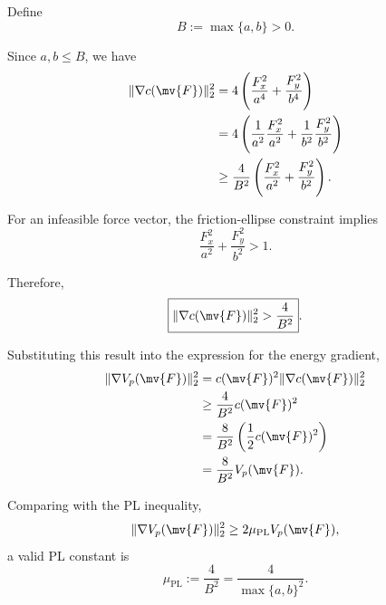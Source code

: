 Define
\begin{equation}
	B
	:=
	\max\{a,b\}
	>0
	.
\end{equation}

Since $a,b\leq B$, we have
\begin{equation}
	\begin{aligned}
		\|\nabla c(\mv{F})\|_2^2
		 & =
		4
		\left(
		\frac{F_x^2}{a^4}
		+
		\frac{F_y^2}{b^4}
		\right)
		\\
		 & =
		4
		\left(
		\frac{1}{a^2}
		\frac{F_x^2}{a^2}
		+
		\frac{1}{b^2}
		\frac{F_y^2}{b^2}
		\right)
		\\
		 & \geq
		\frac{4}{B^2}
		\left(
		\frac{F_x^2}{a^2}
		+
		\frac{F_y^2}{b^2}
		\right)
		.
	\end{aligned}
\end{equation}

For an infeasible force vector, the friction-ellipse constraint implies
\begin{equation}
	\frac{F_x^2}{a^2}
	+
	\frac{F_y^2}{b^2}
	>
	1
	.
\end{equation}

Therefore,
\begin{equation}
	\label{Tire:eq:ellipse:gradient:bound}
	\boxed{
		\|\nabla c(\mv{F})\|_2^2
		>
		\frac{4}{B^2}
	}
	.
\end{equation}

Substituting this result into the expression for the energy gradient,
\begin{equation}
	\begin{aligned}
		\|\nabla V_p(\mv{F})\|_2^2
		 & =
		c(\mv{F})^2
		\|\nabla c(\mv{F})\|_2^2
		\\
		 & \geq
		\frac{4}{B^2}
		c(\mv{F})^2
		\\
		 & =
		\frac{8}{B^2}
		\left(
		\frac{1}{2}c(\mv{F})^2
		\right)
		\\
		 & =
		\frac{8}{B^2}
		V_p(\mv{F})
		.
	\end{aligned}
\end{equation}

Comparing with the PL inequality,
\begin{equation}
	\|\nabla V_p(\mv{F})\|_2^2
	\geq
	2\mu_{\mathrm{PL}}V_p(\mv{F})
	,
\end{equation}
a valid PL constant is
\begin{equation}
	\label{Tire:eq:ellipse:pl}
	\boxed{
		\mu_{\mathrm{PL}}
		:=
		\frac{4}{B^2}
		=
		\frac{4}{
			\max\{a,b\}^2
		}
	}
	.
\end{equation}

